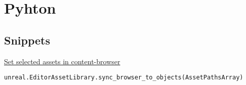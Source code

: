 \chapter{Pyhton}
    \section{Snippets}
        \uline{Set selected assets in content-browser}
        \begin{lstlisting}
unreal.EditorAssetLibrary.sync_browser_to_objects(AssetPathsArray)
        \end{lstlisting}

        